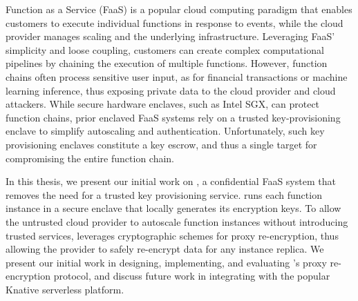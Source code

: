 Function as a Service (FaaS) is a popular cloud computing paradigm that
enables customers to execute individual functions in response to events, while
the cloud provider manages scaling and the underlying infrastructure.
%
Leveraging FaaS' simplicity and loose coupling, customers can create complex
computational pipelines by chaining the execution of multiple functions.
%
However, function chains often process sensitive user input, as for financial
transactions or machine learning inference, thus exposing private data to the
cloud provider and cloud attackers.
%
While secure hardware enclaves, such as Intel SGX, can protect function chains,
prior enclaved FaaS systems rely on a trusted key-provisioning enclave to
simplify autoscaling and authentication.
%
Unfortunately, such key provisioning enclaves constitute a key escrow, and thus
a single target for compromising the entire function chain.


In this thesis, we present our initial work on \SystemName, a confidential FaaS
system that removes the need for a trusted key provisioning service.
%
\SystemName runs each function instance in a secure enclave that locally
generates its encryption keys.
%
To allow the untrusted cloud provider to autoscale function instances without
introducing trusted services, \SystemName leverages cryptographic schemes for
proxy re-encryption, thus allowing the provider to safely re-encrypt data for
any instance replica.
%
We present our initial work in designing, implementing, and evaluating
\SystemName's proxy re-encryption protocol, and discuss future work in
integrating \SystemName with the popular Knative serverless platform.
